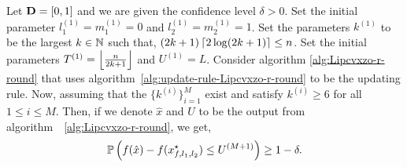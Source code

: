 \begin{proposition}
\label{proposition:zeroth-order-nonsmooth-r-round-one-dim}
Let $\mathbf{D} = [0, 1]$ and we are given the confidence level $\delta > 0$.
Set the initial parameter $l_1^{(1)} = m_1^{(1)}= 0$ and $l_2^{(1)} = m_2 ^{(1)}= 1$. 
Set the parameters $k^{(1)}$ to be the largest $k \in \mathbb{N}$ such that,  
$(2k+1) \left\lceil{2\log (2k+1)}\right\rceil \leq n$. Set the initial parameters 
$T^{(1)} = \left\lfloor{\frac{n}{2k+1}}\right\rfloor$ and $U^{(1)} = L$. Consider algorithm 
\ref{alg:Lipcvxzo-r-round} that uses algorithm~\ref{alg:update-rule-Lipcvxzo-r-round}
to be the updating rule. Now, assuming that the $\{k^{(i)}\}_{i=1}^M$ exist 
and satisfy $k^{(i)} \geq 6$ for all $1\leq i\leq M$. Then, if we denote
$\hat{x}$ and $\hat{U}$ to be the output from algorithm~~\ref{alg:Lipcvxzo-r-round}, 
we get,  
\begin{equation*}
\mathbb{P} \left(f(\hat{x}) - f(x_{f, l_1, l_2}^\star) \leq U^{(M+1)} \right) \geq 1-\delta. 
\end{equation*}
\end{proposition}
